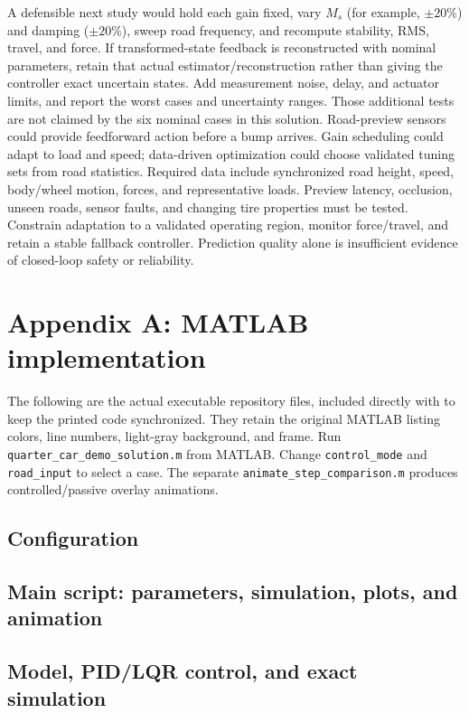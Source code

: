 A defensible next study would hold each gain fixed, vary $M_s$ (for example,
$\pm20\%$) and damping ($\pm20\%$), sweep road frequency, and recompute stability,
RMS, travel, and force. If transformed-state feedback is reconstructed with nominal
parameters, retain that actual estimator/reconstruction rather than giving the
controller exact uncertain states. Add measurement noise, delay, and actuator
limits, and report the worst cases and uncertainty ranges. Those additional tests
are not claimed by the six nominal cases in this solution.
Road-preview sensors could provide feedforward action before a bump arrives.
Gain scheduling could adapt to load and speed; data-driven optimization could
choose validated tuning sets from road statistics. Required data include synchronized
road height, speed, body/wheel motion, forces, and representative loads. Preview
latency, occlusion, unseen roads, sensor faults, and changing tire properties must be
tested. Constrain adaptation to a validated operating region, monitor force/travel,
and retain a stable fallback controller. Prediction quality alone is insufficient
evidence of closed-loop safety or reliability.
\newpage
\appendix
\section*{Appendix A: MATLAB implementation}
The following are the actual executable repository files, included directly with
\texttt{\string} to keep the printed code synchronized. They retain
the original MATLAB listing colors, line numbers, light-gray background, and frame.
Run \texttt{quarter\_car\_demo\_solution.m} from MATLAB. Change
\texttt{control\_mode} and \texttt{road\_input} to select a case. The separate
\texttt{animate\_step\_comparison.m} produces controlled/passive overlay animations.
\subsection*{Configuration}

\subsection*{Main script: parameters, simulation, plots, and animation}

\newpage
\subsection*{Model, PID/LQR control, and exact simulation}

